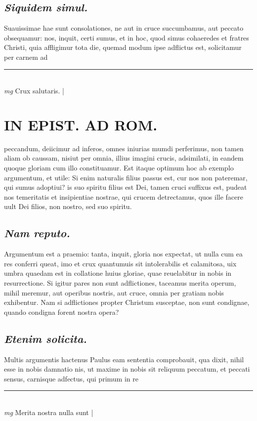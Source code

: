 \documentclass{article}
\begin{document}
\begin{pages}
\subsection*{\textit{Siquidem simul. }}\pstart Suauissimae hae sunt consolationes, ne aut in cruce succumbamus, aut peccato obsequamur: nos, inquit, certi sumus, et in hoc, quod simus cohaeredes et fratres Christi, quia affligimur tota die, quemad modum ipse adflictus est, solicitamur per carnem ad  \pend
\vspace{0.5cm}\noindent
\vspace{0.2cm}\rule{1cm}{0.2pt}\\ 
\hspace{0.2cm}\textit{mg}
\footnotesize Crux salutaris. 
\normalsize| 
\section*{IN EPIST. AD ROM.  }
\marginpar{[ p.93 ]}\pstart peccandum, deiicimur ad inferos, omnes iniurias mumdi perferimus, non tamen aliam ob caussam, nisiut per omnia, illius imagini crucis, adsimilati, in eandem quoque gloriam cum illo constituamur. Est itaque optimum hoc ab exemplo argumentum, et utile: Si enim naturalis filius passus est, cur nos non pateremar, qui sumus adoptiui? is suo spiritu filius est Dei, tamen cruci suffixus est, pudeat nos temeritatis et insipientiae nostrae, qui crucem detrectamus, quos ille facere uult Dei filios, non nostro, sed suo spiritu.   \pend
{}
{}
\subsection*{\textit{Nam reputo. }}\pstart Argumentum est a praemio: tanta, inquit, gloria nos expectat, ut nulla cum ea res conferri queat, imo et crux quantumuis sit intolerabilis et calamitosa, uix umbra quaedam est in collatione huius gloriae, quae reuelabitur in nobis in resurrectione. Si igitur pares non sunt adflictiones, taceamus merita operum, mihil meremur, aut operibus nostris, aut cruce, omnia per gratiam nobis exhibentur. Nam si adflictiones propter Christum susceptae, non sunt condignae, quando condigna forent nostra opera?  \pend
{}
{}
\subsection*{\textit{Etenim solicita. }}\pstart Multis argumentis hactenus Paulus eam sententia comprobauit, qua dixit, nihil esse in nobis damnatio nis, ut maxime in nobis sit reliquum peccatum, et peccati sensus, carnisque adfectus, qui primum in re\pend
\vspace{0.5cm}\noindent
\vspace{0.2cm}\rule{1cm}{0.2pt}\\ 
\hspace{0.2cm}\textit{mg}
\footnotesize Merita nostra nulla sunt 
\normalsize| 

\end{pages}
\end{document}
